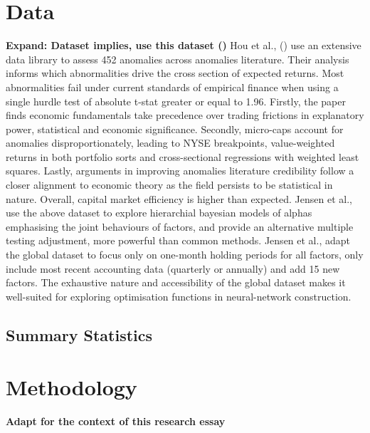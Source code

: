 \documentclass[12pt]{article}
\begin{document}
\section{Data}
\textbf{Expand: Dataset implies, use this dataset (\cite{jensen2021there})}
Hou et al., (\citeyear{hou2020replicating}) use an extensive data library to assess 452 anomalies across anomalies literature.
Their analysis informs which abnormalities drive the cross section of expected returns. 
Most abnormalities fail under current standards of empirical finance when using a single hurdle test of absolute t-stat greater or equal to 1.96.
Firstly, the paper finds economic fundamentals take precedence over trading frictions in explanatory power, statistical and economic significance.
Secondly, micro-caps account for anomalies disproportionately, leading to NYSE breakpoints, value-weighted returns in both portfolio sorts and cross-sectional regressions with weighted least squares. 
Lastly, arguments in improving anomalies literature credibility follow a closer alignment to economic theory as the field persists to be statistical in nature.
Overall, capital market efficiency is higher than expected.
Jensen et al., \citeyear{jensen2021there} use the above dataset to explore hierarchial bayesian models of alphas emphasising the joint behaviours of factors, 
and provide an alternative multiple testing adjustment, more powerful than common methods.
Jensen et al., adapt the global dataset to focus only on one-month holding periods for all factors, only include most recent accounting data (quarterly or annually) and add 15 new factors.
The exhaustive nature and accessibility of the global dataset makes it well-suited for exploring optimisation functions in neural-network construction.
\subsection{Summary Statistics}
\section{Methodology}
\textbf{Adapt for the context of this research essay}
\end{document}
